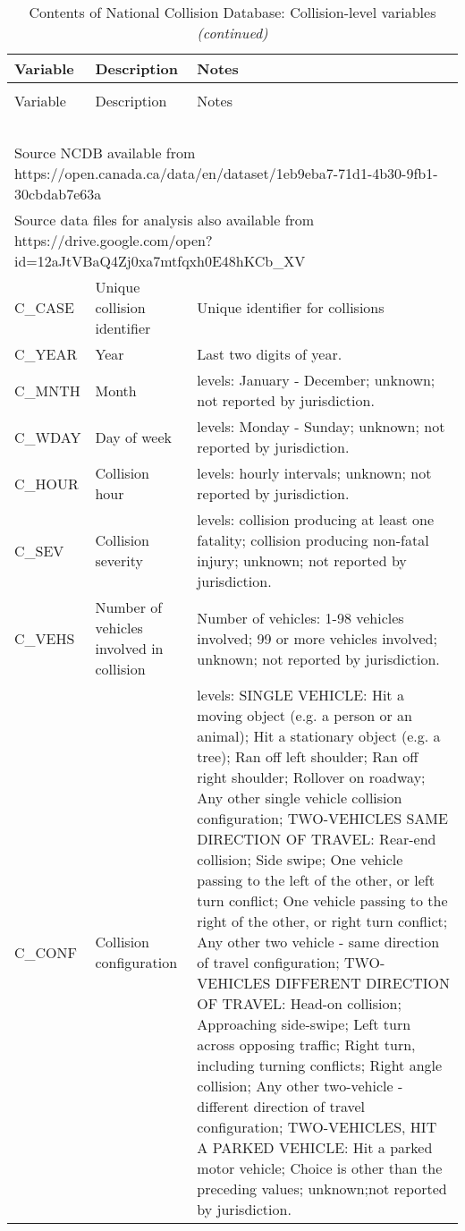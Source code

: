 \documentclass[]{elsarticle} %
\begin{document}
\begin{longtable}[t]{ll>{\raggedright\arraybackslash}p{32em}}
\caption{\label{tab:ncdb-descriptives-collision}\label{tab:ncdb-descriptives-collision}Contents of National Collision Database: Collision-level variables}\\
\toprule
Variable & Description & Notes\\
\midrule
\endfirsthead
\caption[]{\label{tab:ncdb-descriptives-collision}Contents of National Collision Database: Collision-level variables \textit{(continued)}}\\
\toprule
Variable & Description & Notes\\
\midrule
\endhead
\
\endfoot
\bottomrule
\multicolumn{3}{l}{\textit{Note: }}\\
\multicolumn{3}{l}{Source NCDB available from https://open.canada.ca/data/en/dataset/1eb9eba7-71d1-4b30-9fb1-30cbdab7e63a}\\
\multicolumn{3}{l}{Source data files for analysis also available from https://drive.google.com/open?id=12aJtVBaQ4Zj0xa7mtfqxh0E48hKCb\_XV}\\
\endlastfoot
\rowcolor{gray!6}  C\_CASE & Unique collision identifier & Unique identifier for collisions\\
C\_YEAR & Year & Last two digits of year.\\
\rowcolor{gray!6}  C\_MNTH & Month & 14 levels: January - December; unknown; not reported by jurisdiction.\\
C\_WDAY & Day of week & 9 levels: Monday - Sunday; unknown; not reported by jurisdiction.\\
\rowcolor{gray!6}  C\_HOUR & Collision hour & 25 levels: hourly intervals; unknown; not reported by jurisdiction.\\
\addlinespace
C\_SEV & Collision severity & 4 levels: collision producing at least one fatality; collision producing non-fatal injury; unknown; not reported by jurisdiction.\\
\rowcolor{gray!6}  C\_VEHS & Number of vehicles involved in collision & Number of vehicles: 1-98 vehicles involved; 99 or more vehicles involved; unknown; not reported by jurisdiction.\\
C\_CONF & Collision configuration & 21 levels: SINGLE VEHICLE: Hit a moving object (e.g. a person or an animal); Hit a stationary object (e.g. a tree); Ran off left shoulder; Ran off right shoulder; Rollover on roadway; Any other single vehicle collision configuration; TWO-VEHICLES SAME DIRECTION OF TRAVEL: Rear-end collision; Side swipe; One vehicle passing to the left of the other, or left turn conflict; One vehicle passing to the right of the other, or right turn conflict; Any other two vehicle - same direction of travel configuration; TWO-VEHICLES DIFFERENT DIRECTION OF TRAVEL: Head-on collision; Approaching side-swipe; Left turn across opposing traffic; Right turn, including turning conflicts; Right angle collision; Any other two-vehicle - different direction of travel configuration; TWO-VEHICLES, HIT A PARKED VEHICLE: Hit a parked motor vehicle; Choice is other than the preceding values; unknown;not reported by jurisdiction.\\

\end{longtable}
\end{document}
